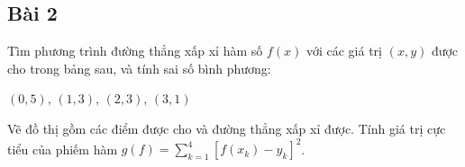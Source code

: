 \documentclass[12pt]{article}
\begin{document}
\subsection{Bài 2}

Tìm phương trình đường thẳng xấp xỉ hàm số $f(x)$ với các giá trị $(x,y)$ được cho trong bảng sau, và tính sai số bình phương:

$(0,5)$, $(1,3)$, $(2,3)$, $(3,1)$





Vẽ đồ thị gồm các điểm được cho và đường thẳng xấp xỉ được. Tính giá trị cực tiểu của phiếm hàm $g(f)=\sum_{k=1}^4 [f(x_k)-y_k]^2$.

% 
% 


% 
% 
\end{document}
